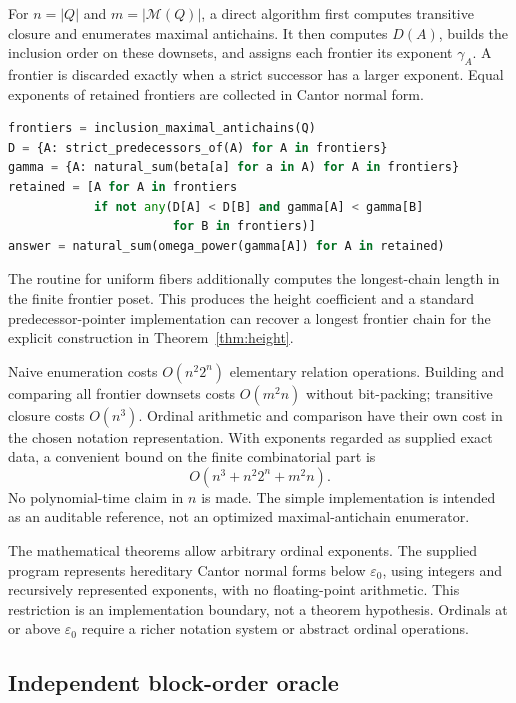 \documentclass[11pt,a4paper]{article}
\theoremstyle{definition}
\theoremstyle{remark}
\newcommand{\M}{\mathcal M}
\newcommand{\eps}{\varepsilon_0}
\begin{document}
For $n=|Q|$ and $m=|\M(Q)|$, a direct algorithm first computes transitive
closure and enumerates maximal antichains. It then computes $D(A)$, builds
the inclusion order on these downsets, and assigns each frontier its
exponent $\gamma_A$. A frontier is discarded exactly when a strict
successor has a larger exponent. Equal exponents of retained frontiers
are collected in Cantor normal form.

\begin{lstlisting}[language=Python,caption={The survivor calculation; ordinary and natural operations stay distinct.}]
frontiers = inclusion_maximal_antichains(Q)
D = {A: strict_predecessors_of(A) for A in frontiers}
gamma = {A: natural_sum(beta[a] for a in A) for A in frontiers}
retained = [A for A in frontiers
            if not any(D[A] < D[B] and gamma[A] < gamma[B]
                       for B in frontiers)]
answer = natural_sum(omega_power(gamma[A]) for A in retained)
\end{lstlisting}

The routine for uniform fibers additionally computes the longest-chain
length in the finite frontier poset. This produces the height coefficient
and a standard predecessor-pointer implementation can recover a longest
frontier chain for the explicit construction in
Theorem~\ref{thm:height}.

Naive enumeration costs $O(n^2 2^n)$ elementary relation operations.
Building and comparing all frontier downsets costs $O(m^2n)$ without
bit-packing; transitive closure costs $O(n^3)$. Ordinal arithmetic and
comparison have their own cost in the chosen notation representation.
With exponents regarded as supplied exact data, a convenient bound on the
finite combinatorial part is
\[
 O(n^3+n^2 2^n+m^2n).
\]
No polynomial-time claim in $n$ is made. The simple implementation is
intended as an auditable reference, not an optimized maximal-antichain
enumerator.

The mathematical theorems allow arbitrary ordinal exponents. The supplied
program represents hereditary Cantor normal forms below $\eps$, using
integers and recursively represented exponents, with no floating-point
arithmetic. This restriction is an implementation boundary, not a theorem
hypothesis. Ordinals at or above $\eps$ require a richer notation system
or abstract ordinal operations.

\subsection{Independent block-order oracle}
\end{document}

